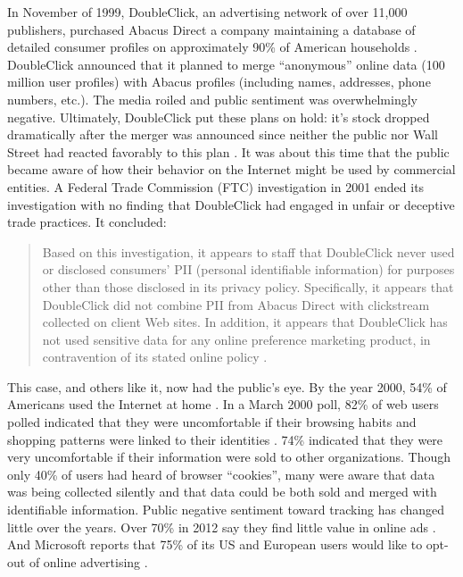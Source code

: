 In November of 1999, DoubleClick, an advertising network of over 11,000 publishers, purchased Abacus Direct a company maintaining a database of detailed consumer profiles on approximately 90\% of American households  \citep{Anonymous:Hkl3lUXG}.  DoubleClick announced that it planned to merge ``anonymous'' online data (100 million user profiles) with Abacus profiles (including names, addresses, phone numbers, etc.). The media roiled and public sentiment was overwhelmingly negative. Ultimately, DoubleClick put these plans on hold: it's stock dropped dramatically after the merger was announced since neither the public nor Wall Street had reacted favorably to this plan  \citep{Anonymous:1999wh}.  It was about this time that the public became aware of how their behavior on the Internet might be used by commercial entities. A Federal Trade Commission (FTC) investigation in 2001 ended its investigation with no finding that DoubleClick had engaged in unfair or deceptive trade practices. It concluded:

\begin{quote}
Based on this investigation, it appears to staff that DoubleClick never used or disclosed consumers' PII (personal identifiable information) for purposes other than those disclosed in its privacy policy. Specifically, it appears that DoubleClick did not combine PII from Abacus Direct with clickstream collected on client Web sites. In addition, it appears that DoubleClick has not used sensitive data for any online preference marketing product, in contravention of its stated online policy \citep{Anonymous:Hkl3lUXG}.
\end{quote}

This case, and others like it, now had the public's eye. By the year 2000, 54\% of Americans used the Internet at home  \citep{Simms:2000vo}.  In a March 2000 poll, 82\% of web users polled indicated that they were uncomfortable if their browsing habits and shopping patterns were linked to their identities  \citep{Anonymous:te}.  74\% indicated that they were very uncomfortable if their information were sold to other organizations. Though only 40\% of users had heard of browser ``cookies'', many were aware that data was being collected silently and that data could be both sold and merged with identifiable information. Public negative sentiment toward tracking has changed little over the years. Over 70\% in 2012 say they find little value in online ads  \citep{Hoofnagle:2012uc}.  And Microsoft reports that 75\% of its US and European users would like to opt-out of online advertising  \citep{Hill:2012uh}. 

